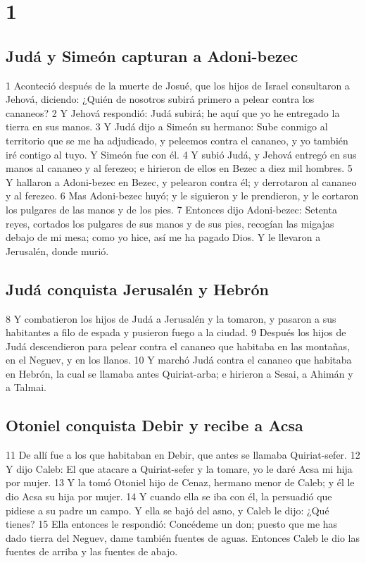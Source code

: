 
\chapter{1}

\section*{Judá y Simeón capturan a Adoni-bezec}

1 Aconteció después de la muerte de Josué, que los hijos de Israel consultaron a Jehová, diciendo: ¿Quién de nosotros subirá primero a pelear contra los cananeos?
2 Y Jehová respondió: Judá subirá; he aquí que yo he entregado la tierra en sus manos.
3 Y Judá dijo a Simeón su hermano: Sube conmigo al territorio que se me ha adjudicado, y peleemos contra el cananeo, y yo también iré contigo al tuyo. Y Simeón fue con él.
4 Y subió Judá, y Jehová entregó en sus manos al cananeo y al ferezeo; e hirieron de ellos en Bezec a diez mil hombres.
5 Y hallaron a Adoni-bezec en Bezec, y pelearon contra él; y derrotaron al cananeo y al ferezeo.
6 Mas Adoni-bezec huyó; y le siguieron y le prendieron, y le cortaron los pulgares de las manos y de los pies.
7 Entonces dijo Adoni-bezec: Setenta reyes, cortados los pulgares de sus manos y de sus pies, recogían las migajas debajo de mi mesa; como yo hice, así me ha pagado Dios. Y le llevaron a Jerusalén, donde murió.
\section*{Judá conquista Jerusalén y Hebrón}

8 Y combatieron los hijos de Judá a Jerusalén y la tomaron, y pasaron a sus habitantes a filo de espada y pusieron fuego a la ciudad.
9 Después los hijos de Judá descendieron para pelear contra el cananeo que habitaba en las montañas, en el Neguev, y en los llanos.
10 Y marchó Judá contra el cananeo que habitaba en Hebrón, la cual se llamaba antes Quiriat-arba; e hirieron a Sesai, a Ahimán y a Talmai.
\section*{Otoniel conquista Debir y recibe a Acsa }

11 De allí fue a los que habitaban en Debir, que antes se llamaba Quiriat-sefer. 
12 Y dijo Caleb: El que atacare a Quiriat-sefer y la tomare, yo le daré Acsa mi hija por mujer.
13 Y la tomó Otoniel hijo de Cenaz, hermano menor de Caleb; y él le dio Acsa su hija por mujer.
14 Y cuando ella se iba con él, la persuadió que pidiese a su padre un campo. Y ella se bajó del asno, y Caleb le dijo: ¿Qué tienes?
15 Ella entonces le respondió: Concédeme un don; puesto que me has dado tierra del Neguev, dame también fuentes de aguas. Entonces Caleb le dio las fuentes de arriba y las fuentes de abajo.
